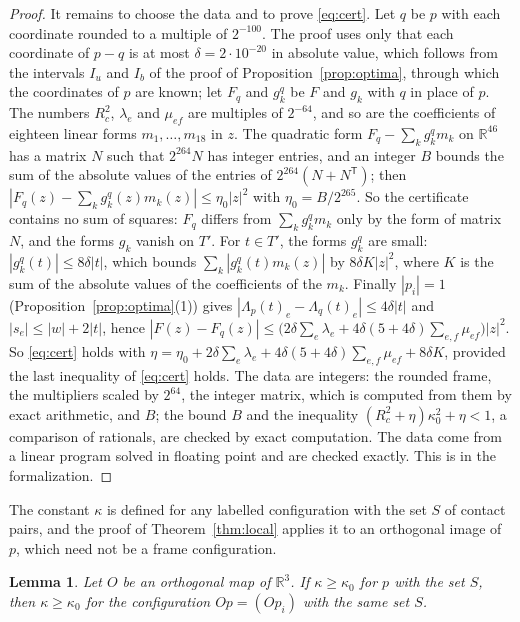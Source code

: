 \documentclass[12pt]{amsart}
\newtheorem{lemma}[theorem]{Lemma}
\theoremstyle{definition}
\theoremstyle{plain}
\theoremstyle{definition}
\newcommand{\R}{\mathbb{R}}
\newcommand{\leanmap}[1]{\ignorespaces}
\newcommand{\mapnote}[1]{\ignorespaces}
\begin{document}
\begin{proof}
It remains to choose the data and to prove \eqref{eq:cert}. Let $q$ be $p$ with each coordinate rounded to a multiple of $2^{-100}$. The proof uses only that each coordinate of $p-q$ is at most $\delta=2\cdot10^{-20}$ in absolute value, which follows from the intervals $I_u$ and $I_b$ of the proof of Proposition~\ref{prop:optima}, through which the coordinates of $p$ are known; let $F_q$ and $g^q_k$ be $F$ and $g_k$ with $q$ in place of $p$. The numbers $R_c^2$, $\lambda_e$ and $\mu_{ef}$ are multiples of $2^{-64}$, and so are the coefficients of eighteen linear forms $m_1,\dots,m_{18}$ in $z$. The quadratic form $F_q-\sum_kg^q_km_k$ on $\R^{46}$ has a matrix $N$ such that $2^{264}N$ has integer entries, and an integer $B$ bounds the sum of the absolute values of the entries of $2^{264}(N+N^{\mathsf T})$; then $|F_q(z)-\sum_kg^q_k(z)m_k(z)|\le\eta_0|z|^2$ with $\eta_0=B/2^{265}$. So the certificate contains no sum of squares: $F_q$ differs from $\sum_kg^q_km_k$ only by the form of matrix $N$, and the forms $g_k$ vanish on $T'$. For $t\in T'$, the forms $g^q_k$ are small: $|g^q_k(t)|\le8\delta|t|$, which bounds $\sum_k|g^q_k(t)m_k(z)|$ by $8\delta K|z|^2$, where $K$ is the sum of the absolute values of the coefficients of the $m_k$. Finally $|p_i|=1$ (Proposition~\ref{prop:optima}(1)) gives $|\Lambda_p(t)_e-\Lambda_q(t)_e|\le4\delta|t|$ and $|s_e|\le|w|+2|t|$, hence $|F(z)-F_q(z)|\le\bigl(2\delta\sum_e\lambda_e+4\delta(5+4\delta)\sum_{e,f}\mu_{ef}\bigr)|z|^2$. So \eqref{eq:cert} holds with $\eta=\eta_0+2\delta\sum_e\lambda_e+4\delta(5+4\delta)\sum_{e,f}\mu_{ef}+8\delta K$, provided the last inequality of \eqref{eq:cert} holds. The data are integers: the rounded frame, the multipliers scaled by $2^{64}$, the integer matrix, which is computed from them by exact arithmetic, and $B$; the bound $B$ and the inequality $(R_c^2+\eta)\kappa_0^2+\eta<1$, a comparison of rationals, are checked by exact computation. The data come from a linear program solved in floating point and are checked exactly. This is  in the formalization.
\end{proof}

The constant $\kappa$ is defined for any labelled configuration with the set $S$ of contact pairs, and the proof of Theorem~\ref{thm:local} applies it to an orthogonal image of $p$, which need not be a frame configuration.

\begin{lemma}\label{lem:kappainv}\leanmap{Tammes15.kappaBound_orthogonal}\mapnote{only that a lower bound $\kappa\ge\kappa_0$ passes from $p$ to $Op$}
Let $O$ be an orthogonal map of $\R^3$. If $\kappa\ge\kappa_0$ for $p$ with the set $S$, then $\kappa\ge\kappa_0$ for the configuration $Op=(Op_i)$ with the same set $S$.
\end{lemma}
\end{document}
